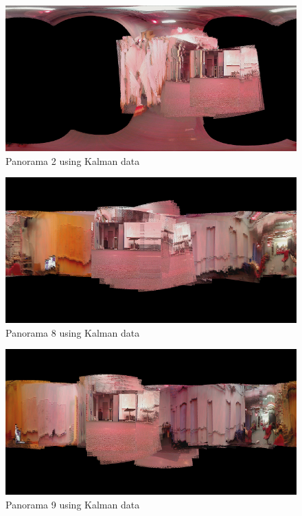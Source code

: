 \documentclass[a4paper]{article}
\begin{document}
\begin{figure}[h]
  \centering
    \includegraphics[width=1\textwidth]{pan_trainset2_kalman_small.png}
  \caption{Panorama 2 using Kalman data\label{fig:panorama2_kalman}}
\end{figure}

\begin{figure}[h]
  \centering
    \includegraphics[width=1\textwidth]{pan_trainset8_kalman_small.png}
  \caption{Panorama 8 using Kalman data\label{fig:panorama8_kalman}}
\end{figure}

\begin{figure}[h]
  \centering
    \includegraphics[width=1\textwidth]{pan_trainset9_kalman_small.png}
  \caption{Panorama 9 using Kalman data\label{fig:panorama9_kalman}}
\end{figure}
\end{document}

